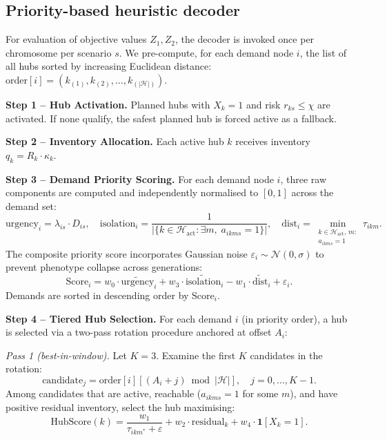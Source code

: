 \documentclass{llncs}
\begin{document}
{%

\subsection{Priority-based heuristic decoder}
\label{sec:decoder}

For evaluation of objective values $Z_1, Z_2$, the decoder is invoked once per chromosome per scenario $s$. We pre-compute, for each demand node $i$, the list of all hubs sorted by increasing Euclidean distance: $\text{order}[i] = (k_{(1)}, k_{(2)}, \ldots, k_{(|\mathcal{H}|)})$.

\textbf{Step 1 -- Hub Activation.} Planned hubs with $X_k = 1$ and risk $r_{ks} \le \chi$ are activated. If none qualify, the safest planned hub is forced active as a fallback.

\textbf{Step 2 -- Inventory Allocation.} Each active hub $k$ receives inventory $q_k = R_k \cdot \kappa_k$.

\textbf{Step 3 -- Demand Priority Scoring.} For each demand node $i$, three raw components are computed and independently normalised to $[0,1]$ across the demand set:
\begin{equation}
    \text{urgency}_i = \lambda_{is} \cdot D_{is}, \quad
    \text{isolation}_i = \frac{1}{|\{k \in \mathcal{H}_{\text{act}} : \exists m,\; a_{ikms}=1\}|}, \quad
    \text{dist}_i = \min_{\substack{k \in \mathcal{H}_{\text{act}},\, m:\\ a_{ikms}=1}} \tau_{ikm}.
    \label{eq:raw_components}
\end{equation}
The composite priority score incorporates Gaussian noise $\varepsilon_i \sim \mathcal{N}(0, \sigma)$ to prevent phenotype collapse across generations:
\begin{equation}
    \text{Score}_i = w_0 \cdot \widetilde{\text{urgency}}_i + w_3 \cdot \widetilde{\text{isolation}}_i - w_1 \cdot \widetilde{\text{dist}}_i + \varepsilon_i.
    \label{eq:demand_score}
\end{equation}
Demands are sorted in descending order by $\text{Score}_i$.

\textbf{Step 4 -- Tiered Hub Selection.} For each demand $i$ (in priority order), a hub is selected via a two-pass rotation procedure anchored at offset $A_i$:

\textit{Pass 1 (best-in-window).} Let $K = 3$. Examine the first $K$ candidates in the rotation:
\begin{equation*}
    \text{candidate}_j = \text{order}[i][(A_i + j) \bmod |\mathcal{H}|], \quad j = 0, \ldots, K-1.
\end{equation*}
Among candidates that are active, reachable ($a_{ikms}=1$ for some $m$), and have positive residual inventory, select the hub maximising:
\begin{equation}
    \text{HubScore}(k) = \frac{w_1}{\tau_{ikm^*} + \varepsilon} + w_2 \cdot \text{residual}_k + w_4 \cdot \mathbf{1}[X_k = 1].
    \label{eq:hub_score}
\end{equation}

}
\end{document}
